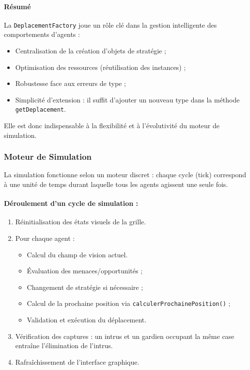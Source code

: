 \vspace{1em}
\paragraph{Résumé}

La \texttt{DeplacementFactory} joue un rôle clé dans la gestion intelligente des comportements d'agents :
\begin{itemize}
    \item Centralisation de la création d’objets de stratégie ;
    \item Optimisation des ressources (réutilisation des instances) ;
    \item Robustesse face aux erreurs de type ;
    \item Simplicité d’extension : il suffit d’ajouter un nouveau type dans la méthode \texttt{getDeplacement}.
\end{itemize}
Elle est donc indispensable à la flexibilité et à l’évolutivité du moteur de simulation.

\subsubsection{ Moteur de Simulation }

La simulation fonctionne selon un moteur discret : chaque cycle (tick) correspond à une unité de temps durant laquelle tous les agents agissent une seule fois.

\paragraph{Déroulement d’un cycle de simulation :}
\begin{enumerate}
    \item Réinitialisation des états visuels de la grille.
    \item Pour chaque agent :
    \begin{itemize}
        \item Calcul du champ de vision actuel.
        \item Évaluation des menaces/opportunités ;
        \item Changement de stratégie si nécessaire ;
        \item Calcul de la prochaine position via \texttt{calculerProchainePosition()} ;
        \item Validation et exécution du déplacement.
    \end{itemize}
    \item Vérification des captures : un intrus et un gardien occupant la même case entraîne l'élimination de l'intrus.
    \item Rafraîchissement de l’interface graphique.
\end{enumerate}

